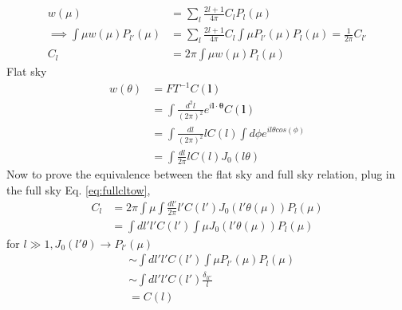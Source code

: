 \begin{align}
    w(\mu) &=\sum_{l}\frac{2l+1}{4\pi}C_lP_l(\mu)\\
    \implies \int \mu w(\mu) P_{l'}(\mu) &= \sum_{l}\frac{2l+1}{4\pi}C_l\int \mu P_{l'}(\mu)P_l(\mu)=\frac{1}{2\pi}C_{l'} \nonumber \\
    C_l &= 2\pi \int \mu w(\mu) P_{l}(\mu)
    \label{eq:fullcltow}
\end{align}
Flat sky
\begin{align}    w(\theta) 
    &=FT^{-1}C(\bm l)\\
    &=\int \frac{d^2l}{(2\pi)^2} e^{i\bm l \cdot \bm \theta}C(\bm l) \nonumber\\
    &=\int \frac{dl}{(2\pi)^2} l C(l)\int d\phi e^{il\theta cos(\phi)} \nonumber\\
    &=\int \frac{dl}{2\pi} l C(l) J_0(l\theta)
\end{align}
Now to prove the equivalence between the flat sky and full sky relation, plug in the full sky Eq. \ref{eq:fullcltow},
\begin{align*}
    C_l &= 2\pi \int \mu \int \frac{dl'}{2\pi} l' C(l') J_0(l'\theta(\mu)) P_{l}(\mu) \nonumber\\
    &= \int dl' l' C(l') \int \mu J_0(l'\theta(\mu)) P_{l}(\mu) \nonumber
\end{align*}
for $l\gg1, J_0(l'\theta)\rightarrow P_{l'}(\mu)$
\begin{align}
    &\sim \int dl' l' C(l') \int \mu P_{l'}(\mu) P_{l}(\mu) \nonumber\\
    &\sim \int dl' l' C(l') \frac{\delta_{ll'}}{l} \nonumber\\
    &= C(l)
\end{align}

